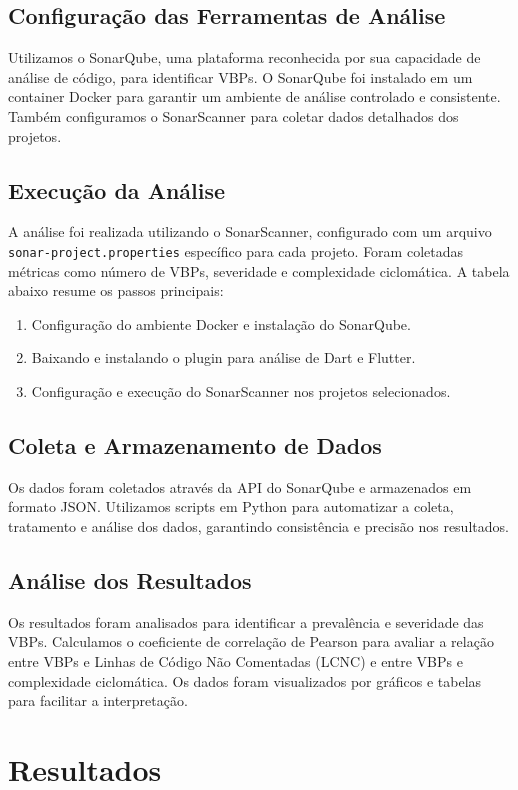 \documentclass[12pt]{article}
\begin{document}
\subsection{Configuração das Ferramentas de Análise}
Utilizamos o SonarQube, uma plataforma reconhecida por sua capacidade de análise de código, para identificar VBPs. O SonarQube foi instalado em um container Docker para garantir um ambiente de análise controlado e consistente. Também configuramos o SonarScanner para coletar dados detalhados dos projetos.

\subsection{Execução da Análise}
A análise foi realizada utilizando o SonarScanner, configurado com um arquivo \texttt{sonar-project.properties} específico para cada projeto. Foram coletadas métricas como número de VBPs, severidade e complexidade ciclomática. A tabela abaixo resume os passos principais:
\begin{enumerate}
    \item Configuração do ambiente Docker e instalação do SonarQube.
    \item Baixando e instalando o plugin para análise de Dart e Flutter.
    \item Configuração e execução do SonarScanner nos projetos selecionados.
\end{enumerate}

\subsection{Coleta e Armazenamento de Dados}
Os dados foram coletados através da API do SonarQube e armazenados em formato JSON. Utilizamos scripts em Python para automatizar a coleta, tratamento e análise dos dados, garantindo consistência e precisão nos resultados.

\subsection{Análise dos Resultados}
Os resultados foram analisados para identificar a prevalência e severidade das VBPs. Calculamos o coeficiente de correlação de Pearson para avaliar a relação entre VBPs e Linhas de Código Não Comentadas (LCNC) e entre VBPs e complexidade ciclomática. Os dados foram visualizados por gráficos e tabelas para facilitar a interpretação.

\section{Resultados}
\end{document}
